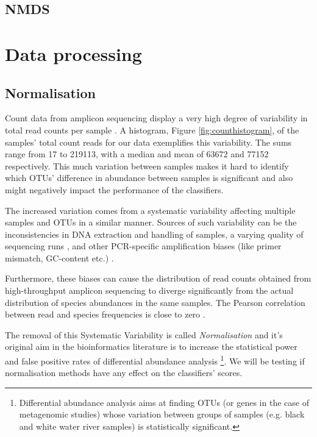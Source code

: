 \subsection{NMDS}
\section{Data processing}
\subsection{Normalisation}

Count data from amplicon sequencing display a very high degree of variability in total read counts per sample \cite{inadmissible_rareying}. A histogram, Figure \ref{fig:counthistogram}, of the samples' total count reads for our data exemplifies this variability. The sums range from 17 to 219113, with a median and mean of 63672 and 77152 respectively. This much variation between samples makes it hard to identify which OTUs' difference in abundance between samples is significant and also might negatively impact the performance of the classifiers. 
 
 The increased variation comes from a systematic variability affecting multiple samples and OTUs in a similar manner. Sources of such variability can be the inconsistencies in DNA extraction and handling of samples,  a varying quality of sequencing runs \cite{pereira_comparison_2018}, and other PCR-specific amplification biases (like primer mismatch, GC-content etc.) \cite{abundance_nodate,krehenwinkel_estimating_2017}.
 
 Furthermore, these biases can cause the distribution of read counts obtained from high-throughput amplicon sequencing to diverge significantly from the actual distribution of species abundances in the same samples. The Pearson correlation between read and species frequencies is close to zero \cite{edgar_unbias:_2017}.
 
 The removal of this Systematic Variability is called \textit{Normalisation} and it's original aim in the bioinformatics literature is to increase the statistical power and false positive rates of differential abundance analysis \footnote{Differential abundance analysis aims at finding OTUs (or genes in the case of metagenomic studies) whose variation between groups of samples (e.g. black and white water river samples) is statistically significant.}. We will be testing if normalisation methods have any effect on the classifiers' scores.
 
